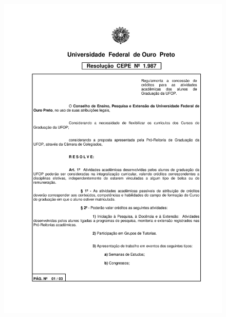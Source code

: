 \label{cepe1987}
\begin{figure}[p]
	\centering 
	\includegraphics[scale=0.7]{capitulos/resolucoes/cepe1987/cepe1987-1.pdf}
\end{figure} \pagebreak


